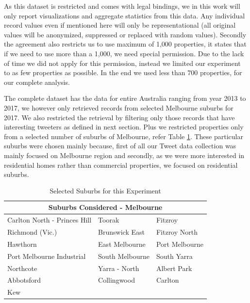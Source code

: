 \documentclass[12pt]{report}
\theoremstyle{named}
\begin{document}
As this dataset is restricted and comes with legal bindings, we in this work will only report visualizations and aggregate statistics from this data. Any individual record values even if mentioned here will only be representational (all original values will be anonymized, suppressed or replaced with random values). Secondly the agreement also restricts us to use maximum of 1,000 properties, it states that if we need to use more than a 1,000, we need special permission. Due to the lack of time we did not apply for this permission, instead we limited our experiment to as few properties as possible. In the end we used less than 700 properties, for our complete analysis.

The complete dataset has the data for entire Australia ranging from year 2013 to 2017, we however only retrieved records from selected Melbourne suburbs for 2017. We also restricted the retrieval by filtering only those records that have interesting tweeters as defined in next section. Plus we restricted properties only from a selected number of suburbs of Melbourne, refer Table \ref{tab:Suburbs Considered}. These particular suburbs were chosen mainly because, first of all our Tweet data collection was mainly focused on Melbourne region and secondly, as we were more interested in residential homes rather than commercial properties, we focused on residential suburbs.





\begin{table}[ht]
\centering
\begin{tabular}{@{}lll@{}}
\toprule
\multicolumn{3}{c}{\textbf{Suburbs Considered - Melbourne}}                        \\ \midrule
Carlton North - Princes Hill & Toorak          & Fitzroy        \\
Richmond (Vic.)              & Brunswick East  & Fitzroy North  \\
Hawthorn                     & East Melbourne  & Port Melbourne \\
Port Melbourne Industrial    & South Melbourne & South Yarra    \\
Northcote                    & Yarra - North   & Albert Park    \\
Abbotsford                   & Collingwood     & Carlton        \\
Kew                          &                 &                \\ \bottomrule
\end{tabular}
\caption{Selected Suburbs for this Experiment}
\label{tab:Suburbs Considered}
\end{table}
\end{document}
